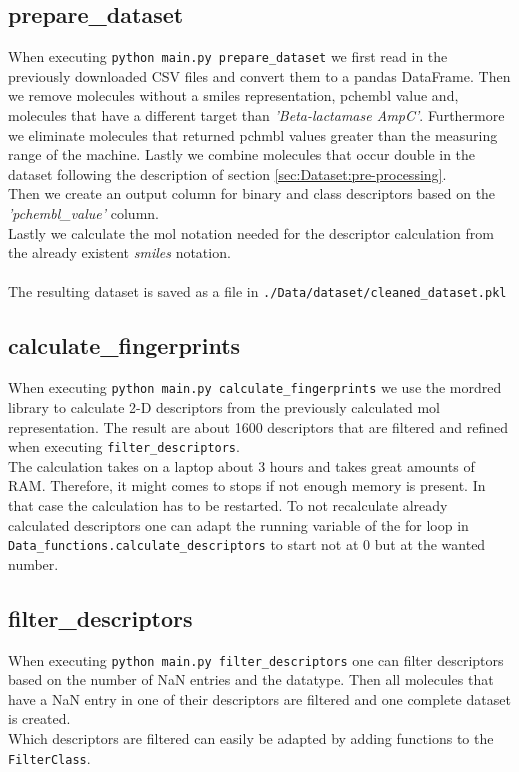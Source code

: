 \documentclass[12pt]{article}
\begin{document}
\subsection{prepare\_dataset}
When executing \texttt{python main.py prepare\_dataset} we first read in the previously downloaded CSV files and convert them to a pandas DataFrame. Then we remove molecules without a smiles representation, pchembl value and, molecules that have a different target than \textit{'Beta-lactamase AmpC'}. Furthermore we eliminate molecules that returned pchmbl values greater than the measuring range of the machine. Lastly we combine molecules that occur double in the dataset following the description of section \ref{sec:Dataset:pre-processing}.\\ Then we create an output column for binary and class descriptors based on the \textit{'pchembl\_value'} column.\\ Lastly we calculate the mol notation needed for the descriptor calculation from the already existent \textit{smiles} notation.\\\\
The resulting dataset is saved as a file in \texttt{./Data/dataset/cleaned\_dataset.pkl}
 
\subsection{calculate\_fingerprints}
When executing \texttt{python main.py calculate\_fingerprints} we use the mordred library \cite{mordredgit,mordred_paper} to calculate 2-D descriptors from the previously calculated mol representation. The result are about 1600 descriptors that are filtered and refined when executing \texttt{filter\_descriptors}.\\
The calculation takes on a laptop about 3 hours and takes great amounts of RAM. Therefore, it might comes to stops if not enough memory is present. In that case the calculation has to be restarted. To not recalculate already calculated descriptors one can adapt the running variable of the for loop in \texttt{Data\_functions.calculate\_descriptors} to start not at 0 but at the wanted number. 

\subsection{filter\_descriptors}
When executing \texttt{python main.py filter\_descriptors} one can filter descriptors based on the number of NaN entries and the datatype. Then all molecules that have a NaN entry in one of their descriptors are filtered and one complete dataset is created.\\
Which descriptors are filtered can easily be adapted by adding functions to the \texttt{FilterClass}.
\end{document}

